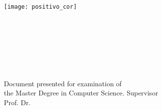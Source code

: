 \begin{titlepage}
    \begin{addmargin}[-0.5cm]{-3cm}
    \begin{center}
        \large
        \bigskip
        \texttt{[image: positivo\_cor]} \\ \medskip
        {\selectfont
            {\huge {\textbf{\myUni}} \\}
            \medskip
            \textbf{\myFaculty} \\
            \textbf{\myDepartment} \\
             \bigskip
        }

        \hfill

        \vfill

        \begingroup
            \textbf{\spacedallcaps{\myTitle} } \\ \bigskip
        \endgroup

        \spacedlowsmallcaps{\myName}\\ \bigskip

        \vfill
        \small Document presented for examination of \\the Master Degree in Computer Science.
        \vfill
        Supervisor\\
        Prof. Dr. \mySupervisor\\
        \vfill
        \myTime

        \vfill

    \end{center}
  \end{addmargin}
\end{titlepage}
